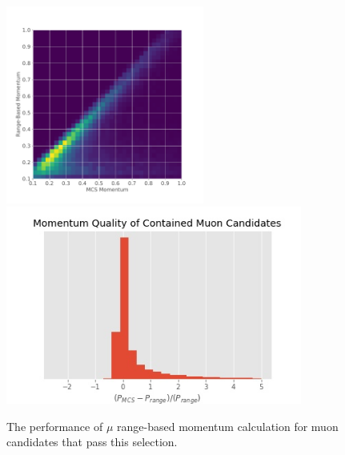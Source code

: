 \begin{figure}
    \centering
    \includegraphics[height=6.5cm]{NuMuCCsel/Images/Ryan/Momres.pdf} \hspace{2mm}
    \includegraphics[height=6.5cm]{NuMuCCsel/Images/Ryan/muoncandidate_pquality.jpg} \hspace{2mm}
    \caption{The performance of $\mu$ range-based momentum calculation for muon candidates that pass this selection.}
    \label{fig:numusel:momres}
\end{figure}

